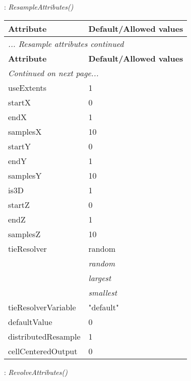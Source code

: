 \documentclass[10pt,a4paper]{report}
\begin{document}
\newpage

{}
: {\it ResampleAttributes() }\\[-3mm]

\begin{longtable}{ll}
{\bf Attribute} & {\bf Default/Allowed values} \\
\hline \hline
\endfirsthead
\multicolumn{2}{l}{{\it ... Resample attributes continued}} \\
{\bf Attribute} & {\bf Default/Allowed values} \\
\hline \hline
\endhead
\hline
\multicolumn{2}{l}{{\it Continued on next page...}} \\
\endfoot
\hline
\endlastfoot

useExtents  &  1 \\
startX  &  0 \\
endX  &  1 \\
samplesX  &  10 \\
startY  &  0 \\
endY  &  1 \\
samplesY  &  10 \\
is3D  &  1 \\
startZ  &  0 \\
endZ  &  1 \\
samplesZ  &  10 \\
tieResolver  &  random   \\
 & {\it  random} \\
 & {\it  largest} \\
 & {\it  smallest} \\
tieResolverVariable  &  "default" \\
defaultValue  &  0 \\
distributedResample  &  1 \\
cellCenteredOutput  &  0 \\
\end{longtable}

\newpage

{}
: {\it RevolveAttributes() }\\[-3mm]
\end{document}
